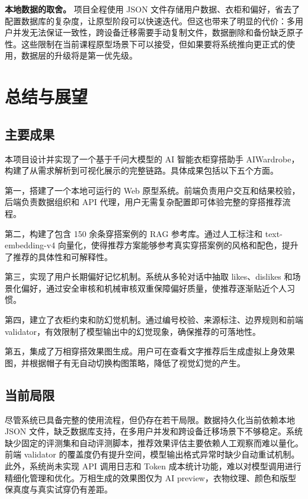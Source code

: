 \documentclass{applemlr}
\begin{document}
\textbf{本地数据的取舍。} 项目全程使用 JSON 文件存储用户数据、衣柜和偏好，省去了配置数据库的复杂度，让原型阶段可以快速迭代。但这也带来了明显的代价：多用户并发无法保证一致性，跨设备迁移需要手动复制文件，数据删除和备份缺乏原子性。这些限制在当前课程原型场景下可以接受，但如果要将系统推向更正式的使用，数据层的升级将是第一优先级。

\section{总结与展望}
\label{sec:conclusion}

\subsection{主要成果}

本项目设计并实现了一个基于千问大模型的 AI 智能衣柜穿搭助手 AIWardrobe，构建了从需求解析到可视化展示的完整链路。具体成果包括以下五个方面。

第一，搭建了一个本地可运行的 Web 原型系统。前端负责用户交互和结果校验，后端负责数据组织和 API 代理，用户无需复杂配置即可体验完整的穿搭推荐流程。

第二，构建了包含 150 余条穿搭案例的 RAG 参考库。通过人工标注和 text-embedding-v4 向量化，使得推荐方案能够参考真实穿搭案例的风格和配色，提升了推荐的具体性和可解释性。

第三，实现了用户长期偏好记忆机制。系统从多轮对话中抽取 likes、dislikes 和场景化偏好，通过安全审核和机械审核双重保障偏好质量，使推荐逐渐贴近个人习惯。

第四，建立了衣柜约束和防幻觉机制。通过编号校验、来源标注、边界规则和前端 validator，有效限制了模型输出中的幻觉现象，确保推荐的可落地性。

第五，集成了万相穿搭效果图生成。用户可在查看文字推荐后生成虚拟上身效果图，并根据帽子有无自动切换构图策略，降低了视觉幻觉的产生。

\subsection{当前局限}

尽管系统已具备完整的使用流程，但仍存在若干局限。数据持久化当前依赖本地 JSON 文件，缺乏数据库支持，在多用户并发和跨设备迁移场景下不够稳定。系统缺少固定的评测集和自动评测脚本，推荐效果评估主要依赖人工观察而难以量化。前端 validator 的覆盖度仍有提升空间，模型输出格式异常时缺少自动重试机制。此外，系统尚未实现 API 调用日志和 Token 成本统计功能，难以对模型调用进行精细化管理和优化。万相生成的效果图仅为 AI preview，衣物纹理、颜色和版型保真度与真实试穿仍有差距。
\end{document}
